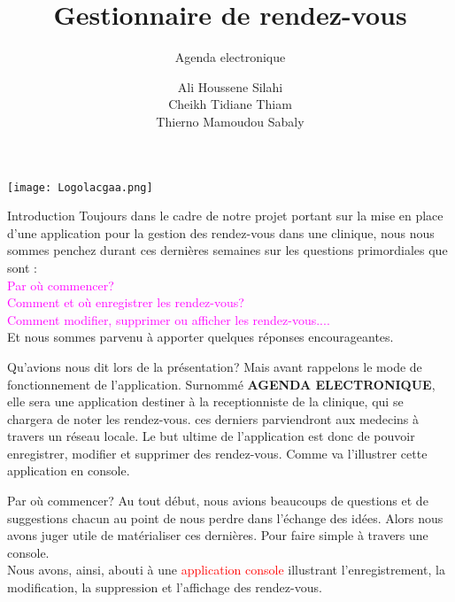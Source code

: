 \documentclass{beamer}
\title{Gestionnaire de rendez-vous}
\subtitle{Agenda electronique}
\institute{Transmission des Données et Sécurité de l'Information}
\date{}
\author{Ali Houssene Silahi\\Cheikh Tidiane Thiam\\Thierno Mamoudou Sabaly}
\begin{document}
\begin{frame}[t]
\texttt{[image: Logolacgaa.png]}
	\titlepage
\end{frame}
\begin{frame}[t]{Introduction}\vspace{3pt}
Toujours dans le cadre de notre projet portant sur la mise en place d'une application pour la gestion des rendez-vous dans une clinique, nous nous sommes penchez durant ces dernières semaines sur les questions primordiales que sont : 
\textcolor{magenta}{\\Par où commencer?\pause \\Comment et où enregistrer les rendez-vous?\pause\\Comment modifier, supprimer ou afficher les rendez-vous....\\}
Et nous sommes parvenu à apporter quelques réponses encourageantes.\\
\end{frame}

\begin{frame}{Qu'avions nous dit lors de la présentation?}
Mais avant rappelons le mode de fonctionnement de l'application. Surnommé \textbf{AGENDA ELECTRONIQUE}, elle sera une application destiner à la receptionniste de la clinique, qui se chargera de noter les rendez-vous. ces derniers parviendront aux medecins à travers un réseau locale. Le but ultime de l'application est donc de pouvoir enregistrer, modifier et supprimer des rendez-vous. Comme va l'illustrer cette application en console. 

\end{frame}
\begin{frame}[t]{Par où commencer?}\vspace{3pt}
Au tout début, nous avions beaucoups de questions et de suggestions chacun au point de nous perdre dans l'échange des idées. Alors nous avons juger utile de matérialiser ces dernières. Pour faire simple à travers une console.\\
Nous avons, ainsi, abouti à une \textcolor{red}{application console} illustrant l'enregistrement, la modification, la suppression et l'affichage des rendez-vous.\\ 
\end{frame}
\end{document}
